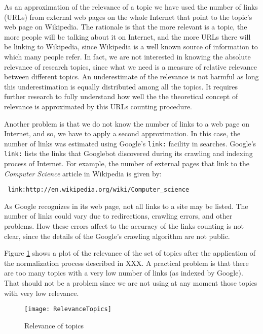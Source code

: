 As an approximation of the relevance of a topic we have used the number of links (URLs) from external web pages on the whole Internet that point to the topic's web page on Wikipedia. The rationale is that the more relevant is a topic, the more people will be talking about it on Internet, and the more URLs there will be linking to Wikipedia, since Wikipedia is a well known source of information to which many people refer. In fact, we are not interested in knowing the absolute relevance of research topics, since what we need is a measure of relative relevance between different topics. An underestimate of the relevance is not harmful as long this underestimation is equally distributed among all the topics. It requires further research to fully understand how well the the theoretical concept of relevance is approximated by this URLs counting procedure. 

Another problem is that we do not know the number of links to a web page on Internet, and so, we have to apply a second approximation. In this case, the number of links was estimated using Google's \texttt{link:} facility in searches. Google's \texttt{link:} lists the links that Googlebot discovered during its crawling and indexing process of Internet. For example, the number of external pages that link to the \emph{Computer Science} article in Wikipedia is given by:

\smallskip

\texttt{
link:http://en.wikipedia.org/wiki/Computer\_science
}

\smallskip

As Google recognizes in its web page, not all links to a site may be listed. The number of links could vary due to redirections, crawling errors, and other problems. How these errors affect to the accuracy of the links counting is not clear, since the details of the Google's crawling algorithm are not public.

Figure \ref{fig:Relevance-of-Topics} shows a plot of the relevance of the set of topics after the application of the normalization process described in {\color{red} XXX}. A practical problem is that there are too many topics with a very low number of links (as indexed by Google). That should not be a problem since we are not using at any moment those topics with very low relevance.

\begin{figure}[h]
\centering\texttt{[image: RelevanceTopics]}
\caption{\label{fig:Relevance-of-Topics}Relevance of topics}
\end{figure}

